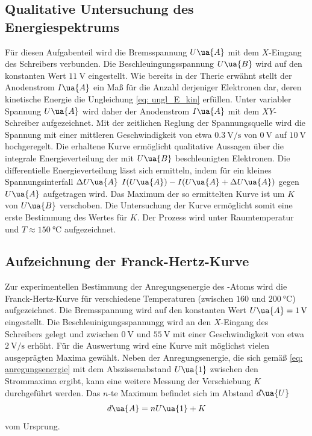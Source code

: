 \subsection{Qualitative Untersuchung des Energiespektrums}
Für diesen Aufgabenteil wird die Bremsspannung $U\ua{A}$ mit dem $X$-Eingang des Schreibers verbunden. Die
Beschleuingungsspannung $U\ua{B}$ wird auf den konstanten Wert $\SI{11}{\volt}$ eingestellt.
Wie bereits
in der Therie erwähnt stellt der Anodenstrom $I\ua{A}$ ein Maß für die Anzahl derjeniger Elektronen dar, deren
kinetische Energie die Ungleichung \eqref{eq: ungl_E_kin} erfüllen.
Unter variabler Spannung $U\ua{A}$ wird daher der Anodenstrom $I\ua{A}$ mit dem $XY$-Schreiber aufgezeichnet.
Mit der zeitlichen Reglung der Spannungsquelle wird die Spannung mit einer mittleren Geschwindigkeit von etwa
$\SI{0.3}{\volt \per\second}$ von $\SI{0}{\volt}$ auf $\SI{10}{\volt}$ hochgeregelt. Die erhaltene Kurve ermöglicht
qualitative Aussagen über die integrale Energieverteilung der mit $U\ua{B}$ beschleunigten Elektronen.
Die differentielle Energieverteilung lässt sich ermitteln, indem für ein kleines Spannungsinterfall
$\Delta U\ua{A}$ $I(U\ua{A}) - I(U\ua{A} + \Delta U\ua{A})$ gegen $U\ua{A}$ aufgetragen wird. Das Maximum
der so ermittelten Kurve ist um $K$ von $U\ua{B}$ verschoben. Die Untersuchung der Kurve ermöglicht somit eine
erste Bestimmung des Wertes für $K$.
Der Prozess wird unter Raumtemperatur und $T \approx \SI{150}{\celsius}$ aufgezeichnet.

\subsection{Aufzeichnung der Franck-Hertz-Kurve}
Zur experimentellen Bestimmung der Anregungsenergie des -Atoms wird die Franck-Hertz-Kurve für
verschiedene Temperaturen (zwischen $\num{160}$ und $\SI{200}{\celsius}$) aufgezeichnet.
Die Bremsspannung wird auf den konstanten Wert $U\ua{A} = \SI{1}{\volt}$ eingestellt.
Die Beschleuinigungsspannungg wird an den $X$-Eingang des Schreibers gelegt und zwischen $\SI{0}{\volt}$
und $\SI{55}{\volt}$ mit einer Geschwindigkeit von etwa $\SI{2}{\volt \per\second}$ erhöht. Für die
Auswertung wird eine Kurve mit möglichst vielen ausgeprägten Maxima gewählt. Neben der Anregungsenergie,
die sich gemäß \ref{eq: anregungsenergie} mit dem Abszissenabstand $U\ua{1}$ zwischen den Strommaxima ergibt,
kann eine weitere Messung der Verschiebung
$K$ durchgeführt werden. Das $n$-te Maximum befindet sich im Abstand $d\ua{U}$
\begin{equation}
  d\ua{A} = nU\ua{1} + K
\end{equation}
vom Ursprung.
